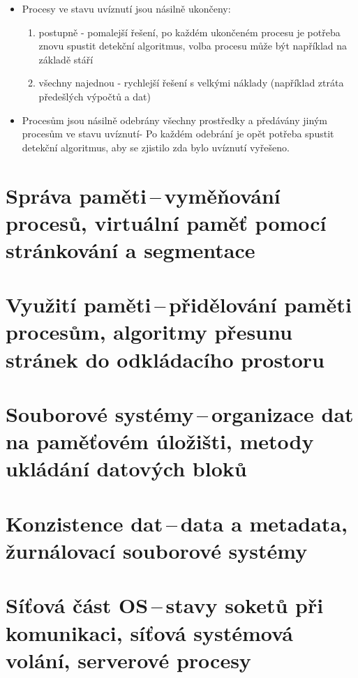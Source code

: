 \begin{itemize}
    \item Procesy ve stavu uvíznutí jsou násilně ukončeny: 
    \begin{enumerate}
        \item postupně - pomalejší řešení, po každém ukončeném procesu je potřeba znovu spustit detekční algoritmus, volba procesu může být například na základě stáří
        \item všechny najednou - rychlejší řešení s velkými náklady (například ztráta předešlých výpočtů a dat)
    \end{enumerate}
    
    \item Procesům jsou násilně odebrány všechny prostředky a předávány jiným procesům ve stavu uvíznutí- Po každém odebrání je opět potřeba spustit detekční algoritmus, aby se zjistilo zda bylo uvíznutí vyřešeno.
\end{itemize}

\newpage
\section{Správa paměti\,--\,vyměňování procesů, virtuální paměť pomocí stránkování a segmentace}

\newpage
\section{Využití paměti\,--\,přidělování paměti procesům, algoritmy přesunu stránek do odkládacího prostoru}

\newpage
\section{Souborové systémy\,--\,organizace dat na paměťovém úložišti, metody ukládání datových bloků}

\newpage
\section{Konzistence dat\,--\,data a metadata, žurnálovací souborové systémy}

\newpage
\section{Síťová část OS\,--\,stavy soketů při komunikaci, síťová systémová volání, serverové procesy}